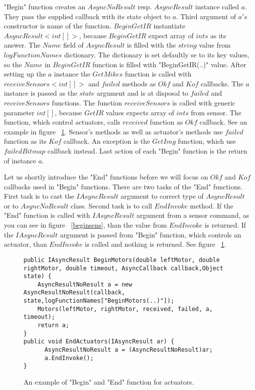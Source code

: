 	"Begin" function creates an $AsyncNoResult$ resp. $AsyncResult$ instance called $a$. They pass the supplied callback with its state object to
	$a$. Third argument of $a's$ constructor is name of the function.
	$BeginGetIR$ instantiate $AsyncResult<int[]>$, because $BeginGetIR$ expect array of $ints$ as its answer. The $Name$ field of $AsyncResult$
	is filled with the $string$ value from $logFunctionNames$ dictionary. The dictionary is set defaultly se to its key values, so
	the $Name$ in $BeginGetIR$ function is filled with "BeginGetIR(..)" value.
	After setting up the $a$ instance the $GetMikes$ function is called with $receiveSensors<int[]>$ and $failed$ methods as $Okf$ and $Kof$ callbacks.
	The $a$ instance is passed as the $state$ argument and is at disposal to $failed$ and $receiveSensors$ functions.
	The function $receiveSensors$ is called with generic parameter $int[]$, because $GetIR$ values expects array of $ints$ from sensor.
	The function, which control actuators, calls $received$ function as $Okf$ callback. See an example in figure ~\ref{beginact}.
	Sensor's methods as well as actuator's methods use $failed$ function as its $Kof$ callback. An exception is the
	$GetImg$ function, which use $failedBitmap$ callback instead.
	Last action of each "Begin" function is the return of instance $a$.

	Let us shortly introduce the "End" functions before we will focus on $Okf$ and $Kof$ callbacks used in "Begin" functions.
	There are two tasks of the "End" functions.
	First task  is to cast the $IAsyncResult$ argument to correct type of $AsyncResult$ or to $AsyncNoResult$ class.
	Second task is to call $EndInvoke$ method.
	If the "End" function is called with $IAsyncResult$ argument from a sensor command, as you can see in figure ~\ref{beginsens}, than the value from $EndInvoke$ is returned.
	If the $IAsyncResult$ argument is passed from "Begin" function, which controls an actuator, than $EndInvoke$ is called and nothing is returned. See figure ~\ref{beginact}.
	

\begin{figure}[!hbp]
\begin{lstlisting}
public IAsyncResult BeginMotors(double leftMotor, double rightMotor, double timeout, AsyncCallback callback,Object state) {
	AsyncResultNoResult a = new AsyncResultNoResult(callback, state,logFunctionNames["BeginMotors(..)"]);
	Motors(leftMotor, rightMotor, received, failed, a, timeout);
	return a;
}
public void EndActuators(IAsyncResult ar) {
      AsyncResultNoResult a = (AsyncResultNoResult)ar;
      a.EndInvoke();
}
\end{lstlisting}	
\caption{An example of "Begin" and "End" function for actuators.} \label{beginact}
\end{figure}
	
